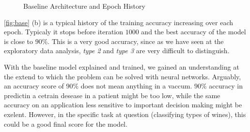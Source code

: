 \documentclass[11pt,twoside]{article}
\numberwithin{Theorem}{section}
\numberwithin{Definition}{section}
\numberwithin{Lemma}{section}
\numberwithin{Algorithm}{section}
\numberwithin{equation}{section}
\begin{document}
\begin{figure}
{{}
}%
\label{fig:base}
\caption{Baseline Architecture and Epoch History}
\end{figure}

\autoref{fig:base} (b) is a typical history of the training accuracy increasing over each epoch. Typicaly it stops before iteration $1000$ and the best accuracy of the model is close to $90\%$. This is a very good accuracy, since as we have seen at the exploratory data analysis, \textit{type 2} and \textit{type 3} are very difficult to distinguish. 

With the baseline model explained and trained, we gained an understanding at the extend to which the problem can be solved with neural networks. Arguably, an accuracy score of $90\%$ does not mean anything in a vaccum. $90\%$ accuracy in predictin a cetrain desease in a patient might be too low, while the same accuracy on an application less sensitive to important decision making might be exelent. However, in the specific task at question (classifying types of wines), this could be a good final score for the model. 
\end{document}
